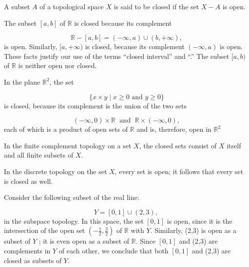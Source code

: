 A subset \(A\) of a topological space \(X\) is said to be closed if the set \(X - A\) is open.

\begin{centeredblock}
\begin{example}
\label{ex:\thesection.\theexample}
 The subset \([ {a,b}]\) of \(\mathbb{R}\) is closed because its complement

 \[
 \mathbb{R} - [ {a,b}] = ( {-\infty,a}) \cup ( {b, + \infty }),
 \]
 is open. Similarly, \(\lbrack a, + \infty )\) is closed, because its complement \(( {-\infty,a})\) is open. These facts justify our use of the terms ``closed interval'' and ``.'' The subset \(\lbrack a,b)\) of \(\mathbb{R}\) is neither open nor closed.
\end{example}
\end{centeredblock}

\begin{centeredblock*}
\begin{example}
\label{ex:\thesection.\theexample}
 In the plane \(\mathbb{R}^{2}\), the set

 \[
 \{ x \times y \mid x \geq 0\text{ and }y \geq 0\}
 \]
 is closed, because its complement is the union of the two sets

 \[
 ( {-\infty,0}) \times \mathbb{R}\;\text{ and }\;\mathbb{R} \times ( {-\infty,0}),
 \]
 each of which is a product of open sets of \(\mathbb{R}\) and is, therefore, open in \(\mathbb{R}^{2}\)
\end{example}
\end{centeredblock*}

\begin{centeredblock}
\begin{example}
\label{ex:\thesection.\theexample}
 In the finite complement topology on a set \(X\), the closed sets consist of \(X\) itself and all finite subsets of \(X\).
\end{example}
\end{centeredblock}

\begin{centeredblock}
\begin{example}
\label{ex:\thesection.\theexample}
 In the discrete topology on the set \(X\), every set is open; it follows that every set is closed as well.
\end{example}
\end{centeredblock}

\begin{centeredblock}
\begin{example}
\label{ex:\thesection.\theexample}
 Consider the following subset of the real line:

 \[
 Y = [ {0,1}] \cup ( {2,3}) \text{, }
 \]
 in the subspace topology. In this space, the set \([ {0,1}]\) is open, since it is the intersection of the open set \(( {-\frac{1}{2},\frac{3}{2}})\) of \(\mathbb{R}\) with \(Y\). Similarly, (2,3) is open as a subset of \(Y\) ; it is even open as a subset of \(\mathbb{R}\). Since \([ {0,1}]\) and (2,3) are complements in \(Y\) of each other, we conclude that both \([ {0,1}]\) and (2,3) are closed as subsets of \(Y\).
\end{example}
\end{centeredblock}

